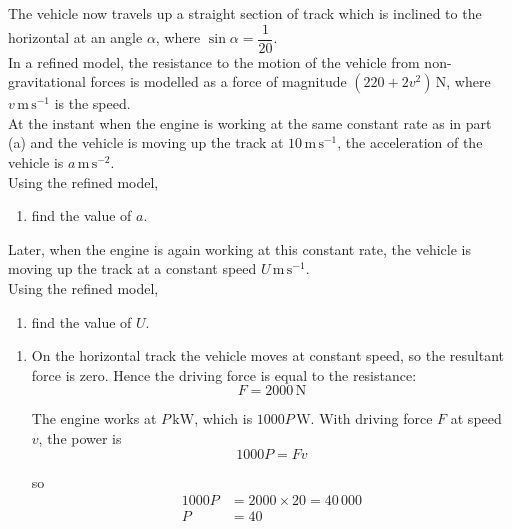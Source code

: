 \documentclass[leqno]{article}
\begin{document}
\begin{enumerate}[
  label=\textbf{\arabic*.},
  leftmargin=*,
  topsep=0pt,
  partopsep=0pt,
  parsep=0pt
]
The vehicle now travels up a straight section of track which is inclined to the horizontal at an angle $\alpha$, where $\sin \alpha = \dfrac{1}{20}$. \\

In a refined model, the resistance to the motion of the vehicle from non-gravitational forces is modelled as a force of magnitude $(220 + 2v^2)\,\mathrm{N}$, where $v\,\mathrm{m\,s^{-1}}$ is the speed. \\

At the instant when the engine is working at the same constant rate as in part (a) and the vehicle is moving up the track at $10\,\mathrm{m\,s^{-1}}$, the acceleration of the vehicle is $a\,\mathrm{m\,s^{-2}}$. \\

Using the refined model, \\

\begin{enumerate}[label=\textbf{(\alph*)}, resume]
  \item find the value of $a$.  \\
\end{enumerate}

Later, when the engine is again working at this constant rate, the vehicle is moving up the track at a constant speed $U\,\mathrm{m\,s^{-1}}$. \\

Using the refined model, \\

\begin{enumerate}[label=\textbf{(\alph*)}, resume]
  \item find the value of $U$.  \\
\end{enumerate}

\vspace*{10pt}

\begin{djsSolution}
\begin{enumerate}[label=\textbf{(\alph*)}, start=1]
  \item On the horizontal track the vehicle moves at constant speed, so the resultant force is zero. Hence the driving force is equal to the resistance:
\[
F=2000\,\mathrm{N}
\]

The engine works at \(P\,\mathrm{kW}\), which is \(1000P\,\mathrm{W}\). With driving force \(F\) at speed \(v\), the power is
\[
1000P=Fv
\]

so
\begin{align*}
1000P &= 2000\times 20=40\,000 \\
P &= 40
\end{align*}


\end{enumerate}
\end{djsSolution}
\end{enumerate}
\end{document}
